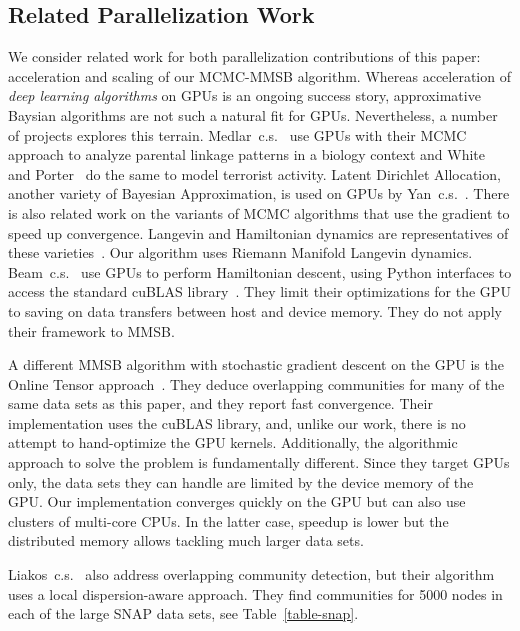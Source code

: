\subsection{Related Parallelization Work}
\label{sec-related}

We consider related work for both parallelization contributions of this paper: acceleration and scaling
of our MCMC-MMSB algorithm.  Whereas acceleration of \emph{deep learning algorithms} on GPUs
is an ongoing success story, approximative Baysian algorithms are
not such a natural fit for GPUs. Nevertheless, a number of projects explores this terrain.
Medlar~c.s.~\cite{journals/bioinformatics/MedlarGSBK13} use GPUs with their
MCMC approach to analyze parental linkage patterns in a biology context and
White and Porter~\cite{DBLP:journals/csda/WhiteP14} do the same to model terrorist activity.
Latent Dirichlet Allocation, another variety of Bayesian Approximation,
is used on GPUs by Yan~c.s.~\cite{DBLP:conf/nips/YanXQ09}. There is also related
work on the variants of MCMC algorithms that use the gradient to speed
up convergence. Langevin and Hamiltonian dynamics are representatives of
these varieties~\cite{Girolami_riemannmanifold}. Our algorithm uses Riemann
Manifold Langevin dynamics. Beam~c.s.~\cite{beam2014fast} use GPUs to perform
Hamiltonian descent, using Python interfaces to access the standard cuBLAS
library~\cite{cuBLAS}. They limit their optimizations for the GPU to saving
on data transfers between host and device memory. They do not apply their
framework to MMSB.

A different MMSB algorithm with stochastic gradient descent on the GPU is
the Online Tensor approach~\cite{DBLP:journals/corr/HuangNHVA13}. They deduce
overlapping communities for many of the same data sets as this paper, and they
report fast convergence. Their implementation uses the cuBLAS
library, and, unlike our work, there is no attempt to hand-optimize the GPU
kernels. Additionally, the algorithmic approach to solve the problem is
fundamentally different.
Since they target GPUs only, the data sets they
can handle are limited by the device memory of the GPU. Our implementation converges
quickly on the GPU but can also use clusters of multi-core CPUs. In the latter case, speedup is
lower but the distributed memory allows tackling much larger data sets.

Liakos~c.s.~\cite{liakos-bigdata16} also address overlapping community detection, but their
algorithm uses a local dispersion-aware approach. They find communities for 5000
nodes in each of the large SNAP data sets, see Table~\ref{table-snap}.

